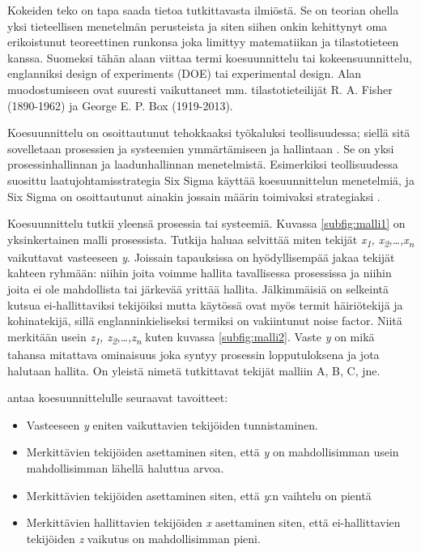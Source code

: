 \documentclass[12pt,a4paper,finnish]{tutthesis}
\begin{document}
Kokeiden teko on tapa saada tietoa tutkittavasta ilmiöstä. Se on teorian
ohella yksi tieteellisen menetelmän perusteista ja siten siihen onkin
kehittynyt oma erikoistunut teoreettinen runkonsa joka limittyy matematiikan ja
tilastotieteen kanssa.
Suomeksi tähän alaan viittaa termi koesuunnittelu tai kokeensuunnittelu,
englanniksi design of experiments (DOE) tai experimental design.
Alan muodostumiseen ovat suuresti vaikuttaneet mm.
tilastotieteilijät R. A. Fisher (1890-1962) ja George E. P. Box (1919-2013).

Koesuunnittelu on osoittautunut tehokkaaksi työkaluksi teollisuudessa; siellä sitä
sovelletaan prosessien
ja systeemien ymmärtämiseen ja hallintaan \parencite{Antony2006} . Se on yksi prosessinhallinnan
ja laadunhallinnan menetelmistä. Esimerkiksi teollisuudessa suosittu laatujohtamisstrategia
Six Sigma käyttää koesuunnittelun menetelmiä, ja Six Sigma on osoittautunut
ainakin jossain määrin
toimivaksi strategiaksi \parencite{Dusharme2001}.

Koesuunnittelu tutkii yleensä prosessia tai systeemiä. Kuvassa \ref{subfig:malli1}
on yksinkertainen malli prosessista. Tutkija haluaa selvittää miten tekijät
\textit{x\textsubscript{1}, x\textsubscript{2},\ldots,x\textsubscript{n}}
vaikuttavat vasteeseen \textit{y}.
Joissain tapauksissa on hyödyllisempää
jakaa tekijät kahteen ryhmään: niihin joita voimme hallita tavallisessa
prosessissa ja niihin joita ei ole mahdollista tai järkevää yrittää
hallita. Jälkimmäisiä on selkeintä kutsua ei-hallittaviksi tekijöiksi
mutta käytössä ovat myös termit häiriötekijä ja kohinatekijä, sillä englanninkieliseksi
termiksi on vakiintunut noise factor.
Niitä merkitään usein
\textit{z\textsubscript{1}, z\textsubscript{2},\ldots,z\textsubscript{n}} kuten
kuvassa \ref{subfig:malli2}.
Vaste \textit{y} on mikä tahansa mitattava ominaisuus joka syntyy prosessin
lopputuloksena ja jota halutaan hallita.
On yleistä nimetä tutkittavat tekijät malliin A, B, C, jne.

\textcite[s.~3]{Montgomery2012} antaa koesuunnittelulle
seuraavat tavoitteet:

\begin{itemize}
\item Vasteeseen \textit{y} eniten vaikuttavien tekijöiden tunnistaminen.
\item Merkittävien tekijöiden asettaminen siten, että \textit{y} on mahdollisimman usein
	mahdollisimman lähellä haluttua arvoa.
\item Merkittävien tekijöiden asettaminen siten, että \textit{y}:n vaihtelu on pientä
\item Merkittävien hallittavien tekijöiden \textit{x} asettaminen siten, että
	ei-hallittavien tekijöiden \textit{z} vaikutus on mahdollisimman pieni.
\end{itemize}
\end{document}

